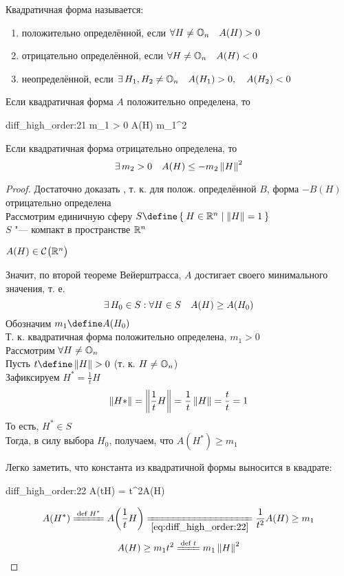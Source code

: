 \begin{remind}
	Квадратичная форма называется:
	\begin{enumerate}
		\item положительно определённой, если $ \forall H \ne \mathbb{O}_{n} \quad A(H) > 0 $
		\item отрицательно определённой, если $ \forall H \ne \mathbb{O}_{n} \quad A(H) < 0 $
		\item неопределённой, если $ \exists\, H_1, H_2 \ne \mathbb{O}_{n} \quad A(H_1) > 0, \quad A(H_2) < 0 $
	\end{enumerate}
\end{remind}

\begin{theorem}
	Если квадратичная форма $ A $ положительно определена, то
	\begin{equ}{diff_high_order:21}
		\exist m_1 > 0 \quad A(H) \ge m_1^2
	\end{equ}
	Если квадратичная форма отрицательно определена, то
	$$ \exists\, m_2 > 0 \quad A(H) \le -m_2\left\|{H}\right\|^2 $$
\end{theorem}

\begin{proof}
	Достаточно доказать , т. к. для полож. определённой $ B $, форма $ -B(H) $ отрицательно определена \\
	Рассмотрим единичную сферу $ S \define \set{H \in \R^n | \norm{H} = 1} $ \\
	$ S $ "--- компакт в пространстве $ \mathbb{R}^n $
	\begin{intuition}
		$ A(H) \in \mathcal{C}^{} \big( {\mathbb{R}^n} \big)  $
	\end{intuition}
	Значит, по второй теореме Вейерштрасса, $ A $ достигает своего минимального значения, т. е.
	$$ \exists\, H_0 \in S : \forall H \in S \quad A(H) \ge A(H_0) $$
	Обозначим $ m_1 \define A(H_0) $ \\
	Т. к. квадратичная форма положительно определена, $ m_1 > 0 $ \\
	Рассмотрим $ \forall H \ne \mathbb{O}_{n} $ \\
	Пусть $ t \define \norm{H} > 0 $ (т. к. $ H \ne \mathbb{O}_{n} $) \\
	Зафиксируем $ H^* = \frac1t H $
	$$ \left\|{H*}\right\| = \left\|{\frac1tH}\right\| = \frac1t\left\|{H}\right\| = \frac{t}t = 1 $$
	То есть, $ H^* \in S $ \\
	Тогда, в силу выбора $ H_0 $, получаем, что $ A(H^*) \ge m_1 $
	\begin{remark}
		Легко заметить, что константа из квадратичной формы выносится в квадрате:
		\begin{equ}{diff_high_order:22}
			A(tH) = t^2A(H)
		\end{equ}
	\end{remark}
	$$ A(H^*) \bdefeq{H^*} A \bigg( \frac1tH \bigg) \undereq{\eref{diff_high_order:22}} \frac1{t^2}A(H) \ge m_1 $$
	$$ A(H) \ge m_1t^2 \bdefeq{t} m_1 \norm{H}^2 $$
\end{proof}

